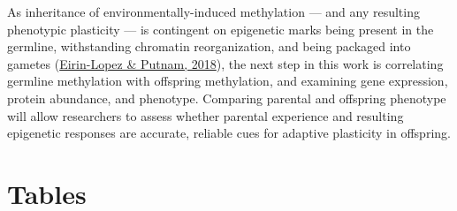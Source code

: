 \documentclass [11pt, proquest] {uwthesis}[2015/03/03]
\begin{document}
As inheritance of environmentally-induced methylation --- and any resulting phenotypic plasticity --- is contingent on epigenetic marks being present in the germline, withstanding chromatin reorganization, and being packaged into gametes (\protect\hyperlink{ref-Eirin-Lopez2018}{Eirin-Lopez \& Putnam, 2018}), the next step in this work is correlating germline methylation with offspring methylation, and examining gene expression, protein abundance, and phenotype. Comparing parental and offspring phenotype will allow researchers to assess whether parental experience and resulting epigenetic responses are accurate, reliable cues for adaptive plasticity in offspring.

\clearpage

\hypertarget{tables-2}{%
\section{Tables}\label{tables-2}}
\end{document}
